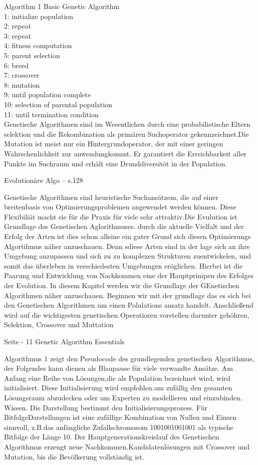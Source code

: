 Algorithm 1 Basic Genetic Algorithm \\
1: initialize population \\
2: repeat \\
3: 		repeat \\
4:			fitness computation \\
5:			parent selection \\
6:			breed \\
7:				crossover \\
8:				mutation \\
9:		until population complete \\
10:		selection of parental population \\
11: until termination condition \\



\iffalse
Genetische Algorithmen sind im Wesentlichen durch eine probabilistische Eltern selektion und die Rekombination als primären Suchoperator gekennzeichnet.Die Mutation ist meist nur ein Hintergrundoperator, der mit einer geringen Wahrschenlichkeit zur anwendungkommt. Er garantiert die Erreichbarkeit aller Punkte im Suchraum und erhält eine Drunddiversitöt in der Population.

Evolutionäre Algo -- s.128


Genetische Algorithmen sind heuristische Suchansätzem, die auf einer breitenbasis von Optimierungsproblemen angewendet werden können. Diese Flexibiliät macht sie für die Praxis für viele sehr attraktiv.Die Evulution ist Grundlage des Genetischen Aglorithmuses. durch die aktuelle Vielfalt und der Erfolg der Arten ist dies schon alleine ein guter Grund sich diesen Optimierungs Algortihmus näher anzuschauen. Denn sdiese Arten sind in der lage sich an ihre Umgebung anzupassen und sich zu zu komplexen Strukturen zuentwickelen, und somit das überleben in verschiedesten Umgebungen eröglichen. Hierbei ist die Paarung und Entwicklung von Nachkommen eine der Hauptprinipen des Erfolges der Evolution. In diesem Kapitel werden wir die Grundlage der GEnetischen Algorithmen näher anzuschauen. Beginnen wir mit der grundlage das es sich bei den Genetischen Algorithmen um einen Polulations ansatz handelt. Anschließend wird auf die wichtigesten genetischen Operatioren vorstellen darunter gehöhren, Selektion, Crossover und Muttation

Seite - 11 Genetic Algorithm Essentials


Algorithmus 1 zeigt den Pseudocode des grundlegenden genetischen Algorithmus, der Folgendes kann dienen als Blaupause für viele verwandte Ansätze. Am Anfang eine Reihe von Lösungen,die als Population bezeichnet wird, wird initialisiert. Diese Initialisierung wird empfohlen.um zufällig den gesamten Lösungsraum abzudecken oder um Experten zu modellieren und einzubinden. Wissen. Die Darstellung bestimmt den Initialisierungsprozess. Für BitfolgeDarstellungen ist eine zufällige Kombination von Nullen und Einsen sinnvoll, z.B.das anfängliche Zufallschromosom 1001001001001 als typische Bitfolge der Länge 10. Der Hauptgenerationskreislauf des Genetischen Algorithmus erzeugt neue Nachkommen.Kandidatenlösungen mit Crossover und Mutation, bis die Bevölkerung vollständig ist.

